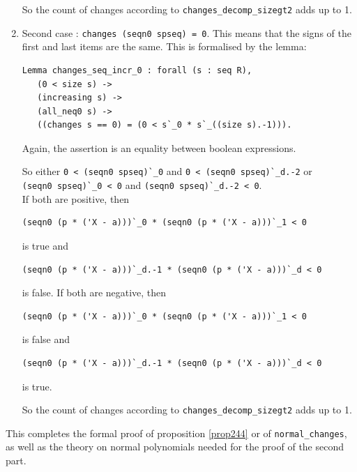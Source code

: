 \documentclass[11pt, a4paper]{article}
\begin{document}
\begin{enumerate}
So the count of changes according to \lstinline!changes_decomp_sizegt2! %
 adds up to 1.

 \item Second case : \lstinline!changes (seqn0 spseq) = 0!.
This means that the signs of the first and last items are the same. This is formalised by the lemma:
\begin{lstlisting}
Lemma changes_seq_incr_0 : forall (s : seq R),
   (0 < size s) ->
   (increasing s) ->
   (all_neq0 s) ->
   ((changes s == 0) = (0 < s`_0 * s`_((size s).-1))).
\end{lstlisting}
Again, the assertion is an equality between boolean expressions.

So either \lstinline!0 < (seqn0 spseq)`_0! and 
\lstinline!0 < (seqn0 spseq)`_d.-2!
or \\
\lstinline!(seqn0 spseq)`_0 < 0! and \lstinline!(seqn0 spseq)`_d.-2 < 0!. 
\\If both are positive, then 
\begin{lstlisting}
(seqn0 (p * ('X - a)))`_0 * (seqn0 (p * ('X - a)))`_1 < 0
\end{lstlisting}
is true and
\begin{lstlisting}
(seqn0 (p * ('X - a)))`_d.-1 * (seqn0 (p * ('X - a)))`_d < 0
\end{lstlisting}
is false.
If both are negative, then 
\begin{lstlisting}
(seqn0 (p * ('X - a)))`_0 * (seqn0 (p * ('X - a)))`_1 < 0
\end{lstlisting}
is false and
\begin{lstlisting}
(seqn0 (p * ('X - a)))`_d.-1 * (seqn0 (p * ('X - a)))`_d < 0
\end{lstlisting}
is true.

So the count of changes according to \lstinline!changes_decomp_sizegt2! %
 adds up to 1.
\end{enumerate}
This completes the formal proof of proposition \ref{prop244} or of \lstinline!normal_changes!, as well as the theory on normal polynomials needed for the proof of the second part.
\end{document}
